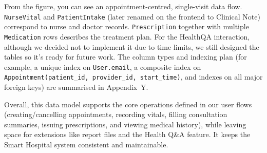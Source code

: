 From the figure, you can see an appointment-centred, single-visit data flow. \texttt{NurseVital} and \texttt{PatientIntake} (later renamed on the frontend to Clinical Note) correspond to nurse and doctor records. \texttt{Prescription} together with multiple \texttt{Medication} rows describes the treatment plan. For the HealthQA interaction, although we decided not to implement it due to time limits, we still designed the tables so it’s ready for future work. The column types and indexing plan (for example, a unique index on \texttt{User.email}, a composite index on \texttt{Appointment(patient\_id, provider\_id, start\_time)}, and indexes on all major foreign keys) are summarised in Appendix~Y.

Overall, this data model supports the core operations defined in our user flows (creating/cancelling appointments, recording vitals, filling consultation summaries, issuing prescriptions, and viewing medical history), while leaving space for extensions like report files and the Health Q\&A feature. It keeps the Smart Hospital system consistent and maintainable.

